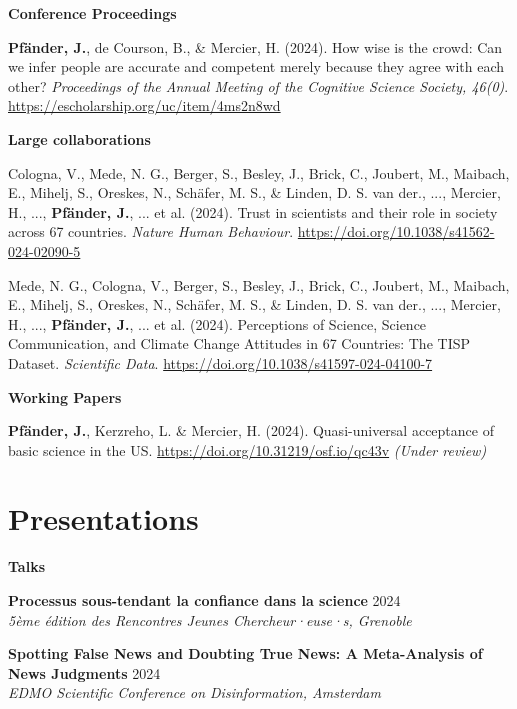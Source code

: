 \documentclass[letterpaper,11pt]{article}
\newcommand{\resumeItem}[1]{
  \item\small{
    {#1 \vspace{-2pt}}
  }
}
\newcommand{\resumeItemWithYear}[3][ ]{ %
  \item\small{
    #2 \hfill {\small #3} \\
    #1
  }
}
\newcommand{\resumePublicationHeading}[1]{
  \vspace{5pt} %
  \noindent\textbf{\small #1} %
  \vspace{2pt} %
}
\begin{document}
\resumePublicationHeading{Conference Proceedings}
\begin{enumerate}[label={[{\arabic*.}]}, left=0.15in, resume]
    \resumeItem{\textbf{Pfänder, J.\footnotemark[1]}, de Courson, B., & Mercier, H. (2024). How wise is the crowd: Can we infer people are accurate and competent merely because they agree with each other? \emph{Proceedings of the Annual Meeting of the Cognitive Science Society, 46(0)}. \url{https://escholarship.org/uc/item/4ms2n8wd}
    }

\end{enumerate}

\resumePublicationHeading{Large collaborations}
\begin{enumerate}[label={[{\arabic*.}]}, left=0.15in, resume]
    \resumeItem{Cologna, V., Mede, N. G., Berger, S., Besley, J., Brick, C., Joubert, M., Maibach, E., Mihelj, S., Oreskes, N., Schäfer, M. S., & Linden, D. S. van der., ..., Mercier, H., ..., \textbf{Pfänder, J.}, ... et al. (2024). Trust in scientists and their role in society across 67 countries. \emph{Nature Human Behaviour}. \url{https://doi.org/10.1038/s41562-024-02090-5}
    }
    
    \resumeItem{Mede, N. G., Cologna, V., Berger, S., Besley, J., Brick, C., Joubert, M., Maibach, E., Mihelj, S., Oreskes, N., Schäfer, M. S., & Linden, D. S. van der., ..., Mercier, H., ..., \textbf{Pfänder, J.}, ... et al. (2024). Perceptions of Science, Science Communication, and Climate Change Attitudes in 67 Countries: The TISP Dataset. \emph{Scientific Data}. \url{https://doi.org/10.1038/s41597-024-04100-7} 
    }

\end{enumerate}

\resumePublicationHeading{Working Papers}
\begin{enumerate}[label={[{\arabic*.}]}, left=0.15in, resume]
    \resumeItem{\textbf{Pfänder, J.\footnotemark[1]}, Kerzreho, L. & Mercier, H. (2024). Quasi-universal acceptance of basic science in the US. \url{https://doi.org/10.31219/osf.io/qc43v} \emph{(Under review)}
    }

\end{enumerate}


\section{Presentations}

\resumePublicationHeading{Talks}
\begin{enumerate}[label={[{\arabic*.}]}, left=0.15in]
    \resumeItemWithYear{\textbf{Processus sous-tendant la confiance dans la science}}{2024}{\textit{5ème édition des Rencontres Jeunes Chercheur·euse·s, Grenoble}}
    \resumeItemWithYear{\textbf{Spotting False News and Doubting True News: A Meta-Analysis of News Judgments}}{2024}{\textit{EDMO Scientific Conference on Disinformation, Amsterdam}}
\end{enumerate}
\end{document}
